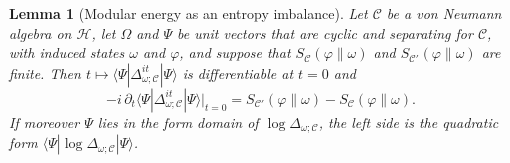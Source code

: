 \documentclass[a4paper,11pt]{article}
\newtheorem{lemma}[theorem]{Lemma}
\theoremstyle{definition}
\begin{document}
\begin{lemma}[Modular energy as an entropy imbalance]\label{lem:modular-energy}
Let $\mathcal C$ be a von Neumann algebra on $\mathcal H$, let $\Omega$ and $\Psi$ be unit vectors that are cyclic and separating for $\mathcal C$, with induced states $\omega$ and $\varphi$, and suppose that $S_{\mathcal C}(\varphi\|\omega)$ and $S_{\mathcal C'}(\varphi\|\omega)$ are finite. Then $t\mapsto\langle\Psi|\Delta_{\omega;\mathcal C}^{it}|\Psi\rangle$ is differentiable at $t=0$ and
\begin{equation}
 -i\,\partial_t\langle\Psi|\Delta_{\omega;\mathcal C}^{it}|\Psi\rangle\big|_{t=0}
 =S_{\mathcal C'}(\varphi\|\omega)-S_{\mathcal C}(\varphi\|\omega).
 \label{eq:modular-energy}
\end{equation}
If moreover $\Psi$ lies in the form domain of $\log\Delta_{\omega;\mathcal C}$, the left side is the quadratic form $\langle\Psi|\log\Delta_{\omega;\mathcal C}|\Psi\rangle$.
\end{lemma}
\end{document}
